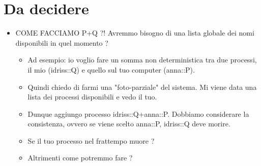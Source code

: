 \documentclass{article}
\begin{document}
\section{Da decidere}
\begin{itemize}
\item COME FACCIAMO P+Q ?! Avremmo bisogno di una lista globale dei nomi disponibili in quel momento ?
\begin{itemize}

\item Ad esempio: io voglio fare un somma non deterministica tra due processi, il mio (idriss::Q) e quello sul tuo computer (anna::P). 

\item Quindi chiedo di farmi una "foto-parziale" del sistema. Mi viene data una lista dei processi disponibili e vedo il tuo.

\item Dunque aggiungo processo idriss::Q+anna::P. Dobbiamo considerare la consistenza, ovvero se viene scelto anna::P, idriss::Q deve morire. 

\item Se il tuo processo nel frattempo muore ?

\item Altrimenti come potremmo fare ?
\end{itemize}
\end{itemize}
\end{document}
